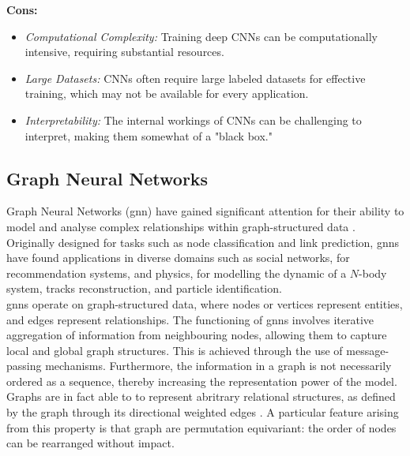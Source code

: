 \textbf{Cons:}
\begin{itemize}
    \item \textit{Computational Complexity:} Training deep CNNs can be computationally intensive, requiring substantial resources.
    \item \textit{Large Datasets:} CNNs often require large labeled datasets for effective training, which may not be available for every application.
    \item \textit{Interpretability:} The internal workings of CNNs can be challenging to interpret, making them somewhat of a "black box."
\end{itemize}

\subsection{Graph Neural Networks}
Graph Neural Networks (\gls{gnn}) have gained significant attention for their ability to model and analyse complex relationships within graph-structured data \cite{graphNetRef}. Originally designed for tasks such as node classification and link prediction, \gls{gnn}s have found applications in diverse domains such as social networks, for recommendation systems, and physics, for modelling the dynamic of a $N$-body system, tracks reconstruction, and particle identification.\\
\gls{gnn}s operate on graph-structured data, where nodes or vertices represent entities, and edges represent relationships. The functioning of \gls{gnn}s involves iterative aggregation of information from neighbouring nodes, allowing them to capture local and global graph structures. This is achieved through the use of message-passing mechanisms. Furthermore, the information in a graph is not necessarily ordered as a sequence, thereby increasing the representation power of the model. Graphs are in fact able to to represent abritrary relational structures, as defined by the graph through its directional weighted edges \cite{graphInductiveBias}. A particular feature arising from this property is that graph are permutation equivariant: the order of nodes can be rearranged without impact. \\

